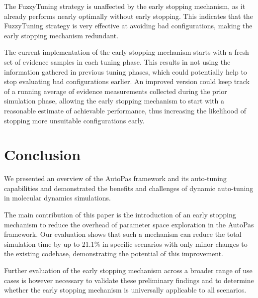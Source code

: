 \documentclass[conference]{IEEEtran}
\begin{document}
\begin{description}[leftmargin=1.2em, font=\itshape, style=nextline]
        The FuzzyTuning strategy is unaffected by the early stopping mechanism, as it already performs nearly optimally without early stopping. This indicates that the FuzzyTuning strategy is very effective at avoiding bad configurations, making the early stopping mechanism redundant.

    \item[Future Work:]
        The current implementation of the early stopping mechanism starts with a fresh set of evidence samples in each tuning phase. This results in not using the information gathered in previous tuning phases, which could potentially help to stop evaluating bad configurations earlier. An improved version could keep track of a running average of evidence measurements collected during the prior simulation phase, allowing the early stopping mechanism to start with a reasonable estimate of achievable performance, thus increasing the likelihood of stopping more unsuitable configurations early.
\end{description}

\section{Conclusion}

We presented an overview of the AutoPas framework and its auto-tuning capabilities and demonstrated the benefits and challenges of dynamic auto-tuning in molecular dynamics simulations.

The main contribution of this paper is the introduction of an early stopping mechanism to reduce the overhead of parameter space exploration in the AutoPas framework. Our evaluation shows that such a mechanism can reduce the total simulation time by up to 21.1\% in specific scenarios with only minor changes to the existing codebase, demonstrating the potential of this improvement.

Further evaluation of the early stopping mechanism across a broader range of use cases is however necessary to validate these preliminary findings and to determine whether the early stopping mechanism is universally applicable to all scenarios.

\newpage



\end{document}
